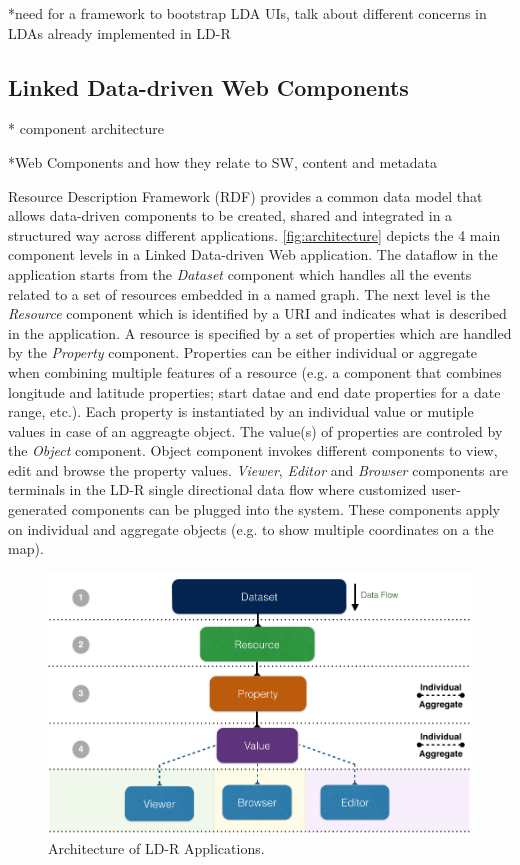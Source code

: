 \documentclass{acm_proc_article-sp}
\begin{document}
*need for a framework to bootstrap LDA UIs, talk about different concerns in LDAs already implemented in LD-R

\subsection{Linked Data-driven Web Components}
* component architecture

*Web Components and how they relate to SW, content and metadata

Resource Description Framework (RDF) provides a common data model that allows data-driven components to be created, shared and integrated in a structured way across different applications. \autoref{fig:architecture} depicts the 4 main component levels in a Linked Data-driven Web application.
The dataflow in the application starts from the \emph{Dataset} component which handles all the events related to a set of resources embedded in a named graph.
The next level is the \emph{Resource} component which is identified by a URI and indicates what is described in the application.
A resource is specified by a set of properties which are handled by the \emph{Property} component. Properties can be either individual or aggregate when combining multiple features of a resource (e.g. a component that combines longitude and latitude properties; start datae and end date properties for a date range, etc.).
Each property is instantiated by an individual value or mutiple values in case of an aggreagte object. 
The value(s) of properties are controled by the \emph{Object} component.
Object component invokes different components to view, edit and browse the property values.
\emph{Viewer}, \emph{Editor} and \emph{Browser} components are terminals in the LD-R single directional data flow where customized user-generated components can be plugged into the system.
These components apply on individual and aggregate objects (e.g. to show multiple coordinates on a the map).

\begin{figure}[tb]
  \includegraphics[width=1\linewidth]{images/architecture.jpg}
  \caption{Architecture of LD-R Applications.}
  \label{fig:architecture}
\end{figure}
\end{document}
